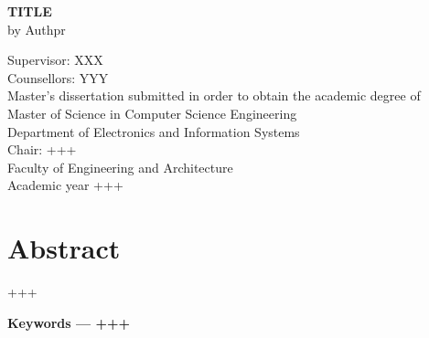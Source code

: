 \begin{center}
    \noindent
    \Large \textbf{TITLE} \\
    \large by \Large Authpr \\
\end{center}
\large Supervisor: XXX \\
Counsellors: YYY \\

\noindent
Master's dissertation submitted in order to obtain the academic degree of\\
Master of Science in Computer Science Engineering \\

\noindent
Department of Electronics and Information Systems\\
Chair: +++ \\
Faculty of Engineering and Architecture \\
Academic year +++
\normalsize
\section*{Abstract}
+++

{\bfseries Keywords --- +++}